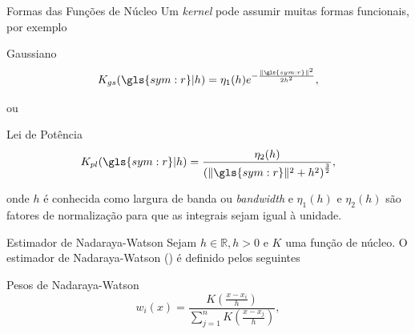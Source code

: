 \documentclass[ucs,8pt]{beamer}
\begin{document}
\begin{frame}{Formas das Funções de Núcleo}
	Um \emph{kernel} pode assumir muitas formas funcionais, por exemplo 
	\begin{block}{Gaussiano}
		\begin{equation}
			\ensuremath{
				K_{gs}(\gls{sym:r}\arrowvert h) = \eta_1(h)
					e^{- \frac{\|\gls{sym:r}\|^2}
		 				 	  {2 h^2 }},
		 	}
		\label{eq:kernel_gs}
		\end{equation}
	\end{block}
ou
	\begin{block}{Lei de Potência}
		\begin{equation}
			\ensuremath{
				K_{pl}(\gls{sym:r}\arrowvert h) = 
					\frac{\eta_2(h)}
		 				 {\left( \|\gls{sym:r}\|^2 + h^2 \right)^{\frac{3}{2}} },
		 	}
		\label{eq:kernel_pl}
		\end{equation}
	\end{block}
	onde $h$ é conhecida como \alert{largura de banda} ou
	\emph{bandwidth} e $\eta_1(h)$ e $\eta_2(h)$ são fatores de normalização para
	que as integrais sejam igual à unidade.
\end{frame}


\begin{frame}{Estimador de Nadaraya-Watson}
	Sejam $h \in \mathbb{R}, h > 0$ e $K$ uma função de núcleo.
	O estimador de Nadaraya-Watson (\citet{nadaraya_1965}) é definido pelos seguintes
	\begin{block}{Pesos de Nadaraya-Watson}
		\begin{equation}
			\ensuremath{
				w_i(x) = \frac{ K\left( \frac{x - x_i}{h} \right)}
							  {\sum_{j=1}^{n} K\left( \frac{x - x_j}{h} \right) },
			}
		\label{eq:rate_wi}
		\end{equation}
	\end{block}
\end{frame}


\subsection{\citet{frankel_1995}}
\end{document}
